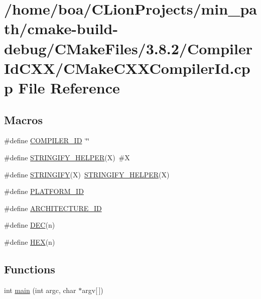 \hypertarget{a00015}{}\section{/home/boa/\+C\+Lion\+Projects/min\+\_\+path/cmake-\/build-\/debug/\+C\+Make\+Files/3.8.2/\+Compiler\+Id\+C\+X\+X/\+C\+Make\+C\+X\+X\+Compiler\+Id.cpp File Reference}
\label{a00015}
\subsection*{Macros}
\begin{DoxyCompactItemize}
\item 
\#define \hyperlink{a00015_a81dee0709ded976b2e0319239f72d174_a81dee0709ded976b2e0319239f72d174}{C\+O\+M\+P\+I\+L\+E\+R\+\_\+\+ID}~\char`\"{}\char`\"{}
\item 
\#define \hyperlink{a00015_a2ae9b72bb13abaabfcf2ee0ba7d3fa1d_a2ae9b72bb13abaabfcf2ee0ba7d3fa1d}{S\+T\+R\+I\+N\+G\+I\+F\+Y\+\_\+\+H\+E\+L\+P\+ER}(X)~\#X
\item 
\#define \hyperlink{a00015_a43e1cad902b6477bec893cb6430bd6c8_a43e1cad902b6477bec893cb6430bd6c8}{S\+T\+R\+I\+N\+G\+I\+FY}(X)~\hyperlink{a00015_a2ae9b72bb13abaabfcf2ee0ba7d3fa1d_a2ae9b72bb13abaabfcf2ee0ba7d3fa1d}{S\+T\+R\+I\+N\+G\+I\+F\+Y\+\_\+\+H\+E\+L\+P\+ER}(X)
\item 
\#define \hyperlink{a00015_adbc5372f40838899018fadbc89bd588b_adbc5372f40838899018fadbc89bd588b}{P\+L\+A\+T\+F\+O\+R\+M\+\_\+\+ID}
\item 
\#define \hyperlink{a00015_aba35d0d200deaeb06aee95ca297acb28_aba35d0d200deaeb06aee95ca297acb28}{A\+R\+C\+H\+I\+T\+E\+C\+T\+U\+R\+E\+\_\+\+ID}
\item 
\#define \hyperlink{a00015_ad1280362da42492bbc11aa78cbf776ad_ad1280362da42492bbc11aa78cbf776ad}{D\+EC}(n)
\item 
\#define \hyperlink{a00015_a46d5d95daa1bef867bd0179594310ed5_a46d5d95daa1bef867bd0179594310ed5}{H\+EX}(n)
\end{DoxyCompactItemize}
\subsection*{Functions}
\begin{DoxyCompactItemize}
\item 
int \hyperlink{a00015_a0ddf1224851353fc92bfbff6f499fa97_a0ddf1224851353fc92bfbff6f499fa97}{main} (int argc, char $\ast$argv\mbox{[}$\,$\mbox{]})
\end{DoxyCompactItemize}
